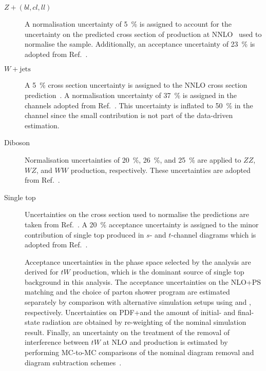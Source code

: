 \begin{description}

\item[$Z + (bl, cl, ll)$] A normalisation uncertainty of
  \SI{5}{\percent} is assigned to account for the uncertainty on the
  predicted cross section of \Zjets production at
  NNLO~\cite{Anastasiou:2003ds} used to normalise the
  sample. Additionally, an acceptance uncertainty of \SI{23}{\percent}
  is adopted from Ref.~\cite{HIGG-2018-51}.

\item[$W + \text{jets}$] A \SI{5}{\percent} cross section uncertainty
  is assigned to the NNLO cross section
  prediction~\cite{Anastasiou:2003ds}. A normalisation uncertainty of
  \SI{37}{\percent} is assigned in the \lephad channels adopted from
  Ref.~\cite{HIGG-2018-51}. This uncertainty is inflated to
  \SI{50}{\percent} in the \hadhad channel since the small \Wjets
  contribution is not part of the data-driven \faketauhadvis
  estimation.

\item[Diboson] Normalisation uncertainties of \SI{20}{\percent},
  \SI{26}{\percent}, and \SI{25}{\percent} are applied to $ZZ$, $WZ$,
  and $WW$ production, respectively. These uncertainties are adopted
  from Ref.~\cite{HIGG-2018-51}.

\item[Single top] Uncertainties on the cross section used to normalise
  the predictions are taken from Ref.~\cite{stopxsec}. A
  \SI{20}{\percent} acceptance uncertainty is assigned to the minor
  contribution of single top produced in $s$- and $t$-channel diagrams
  which is adopted from Ref.~\cite{HIGG-2018-51}.

  Acceptance uncertainties in the phase space selected by the analysis
  are derived for $tW$ production, which is the dominant source of
  single top background in this analysis. The acceptance uncertainties
  on the NLO+PS matching and the choice of parton shower program are
  estimated separately by comparison with alternative simulation
  setups using \MGNLO[2.6.2] and \HERWIG[7],
  respectively. Uncertainties on PDF+\alphas and the amount of
  initial- and final-state radiation are obtained by re-weighting of
  the nominal simulation result. Finally, an uncertainty on the
  treatment of the removal of interference between $tW$ at NLO
  and \ttbar production is estimated by performing MC-to-MC
  comparisons of the nominal diagram removal and diagram subtraction
  schemes~\cite{Frixione:2008yi}.


\end{description}
